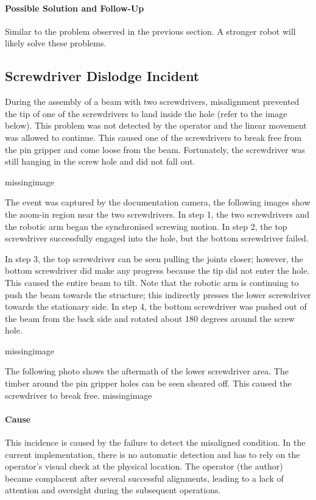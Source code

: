 \paragraph{Possible Solution and Follow-Up}
Similar to the problem observed in the previous section. A stronger robot will likely solve these problems.

\subsection{Screwdriver Dislodge Incident}
\label{subsection:exploration-4-screwdriver-dislodge-incident}

During the assembly of a beam with two screwdrivers, misalignment prevented the tip of one of the screwdrivers to land inside the hole (refer to the image below). This problem was not detected by the operator and the linear movement was allowed to continue. This caused one of the screwdrivers to break free from the pin gripper and come loose from the beam. Fortunately, the screwdriver was still hanging in the screw hole and did not fall out.

missingimage

The event was captured by the documentation camera, the following images show the zoom-in region near the two screwdrivers. In step 1, the two screwdrivers and the robotic arm began the synchronised screwing motion. In step 2, the top screwdriver successfully engaged into the hole, but the bottom screwdriver failed. 

In step 3, the top screwdriver can be seen pulling the joints closer; however, the bottom screwdriver did make any progress because the tip did not enter the hole. This caused the entire beam to tilt. Note that the robotic arm is continuing to push the beam towards the structure; this indirectly presses the lower screwdriver towards the stationary side. In step 4, the bottom screwdriver was pushed out of the beam from the back side and rotated about 180 degrees around the screw hole. 

missingimage

The following photo shows the aftermath of the lower screwdriver area. The timber around the pin gripper holes can be seen sheared off. This caused the screwdriver to break free.
missingimage

\paragraph{Cause}
This incidence is caused by the failure to detect the misaligned condition. In the current implementation, there is no automatic detection and has to rely on the operator’s visual check at the physical location. 
The operator (the author) became complacent after several successful alignments, leading to a lack of attention and oversight during the subsequent operations.

